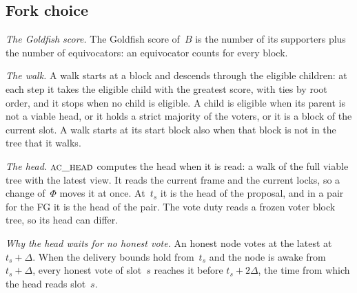 \documentclass{article}
\newcommand{\Fr}{\Phi}
\begin{document}
\subsection{Fork choice}\label{sec:sa-fc}

\emph{The Goldfish score.}  The Goldfish score of~$B$ is the number of its
supporters plus the number of equivocators: an equivocator counts for
every block.

\emph{The walk.}  A walk starts at a block and descends through the
eligible children: at each step it takes the eligible child with the
greatest score, with ties by root order, and it stops when no child is
eligible.  A child is eligible when its parent is not a viable head, or it
holds a strict majority of the voters, or it is a block of the current
slot.  A walk starts at its start block also when that block is not in the
tree that it walks.

\emph{The head.}  $\Call{ac\_head}{}$ computes the head when it is read: a
walk of the full viable tree with the latest view.  It reads the current
frame and the current locks, so a change of~$\Fr$ moves it at once.
At~$t_s$ it is the head of the proposal, and in a pair for the FG it is the head of
the pair.  The vote duty reads a frozen voter block tree, so its
head can differ.

\emph{Why the head waits for no honest vote.}  An honest node votes at the
latest at $t_s+\Delta$.  When the delivery bounds hold from~$t_s$ and the
node is awake from $t_s+\Delta$, every honest vote of slot~$s$ reaches it
before $t_s+2\Delta$, the time from which the head reads slot~$s$.
\end{document}
